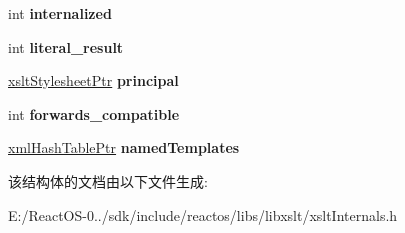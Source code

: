\begin{DoxyCompactItemize}
$$\item 
\mbox{\label{struct__xslt_stylesheet_a914f56e89f2649ba7874f2390d965ccb}} 
int {\bfseries internalized}
\item 
\mbox{\label{struct__xslt_stylesheet_acd8050e775c5fd2285c44dd1ab82fa92}} 
int {\bfseries literal\+\_\+result}
\item 
\mbox{\label{struct__xslt_stylesheet_ad0636a3a8ada5e963f8641212b88d024}} 
\hyperlink{struct__xslt_stylesheet}{xslt\+Stylesheet\+Ptr} {\bfseries principal}
\item 
\mbox{\label{struct__xslt_stylesheet_af911fb549e3f38b6059311b86d88bcf5}} 
int {\bfseries forwards\+\_\+compatible}
\item 
\mbox{\label{struct__xslt_stylesheet_a2d67d9bf92f530509e140fa482ef6095}} 
\hyperlink{struct__xml_hash_table}{xml\+Hash\+Table\+Ptr} {\bfseries named\+Templates}
\end{DoxyCompactItemize}


该结构体的文档由以下文件生成\+:\begin{DoxyCompactItemize}
\item 
E\+:/\+React\+O\+S-\/0../sdk/include/reactos/libs/libxslt/xslt\+Internals.\+h\end{DoxyCompactItemize}

